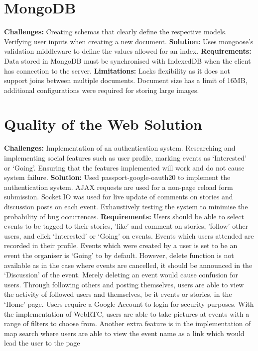 \documentclass[11pt, a4paper]{article}
\begin{document}
\section{MongoDB}
\textbf{Challenges:} Creating schemas that clearly define the respective models. Verifying user
inputs when creating a new document. \textbf{Solution:} Uses mongoose's validation middleware
\cite{validation} to define the values allowed for an index. \textbf{Requirements:} Data stored in
MongoDB must be synchronised with IndexedDB when the client has connection to the server.
\textbf{Limitations:} Lacks flexibility as it does not support joins between multiple documents.
Document size has a limit of 16MB, additional configurations were required for storing large images.

\section{Quality of the Web Solution}
\textbf{Challenges:} Implementation of an authentication system. Researching and implementing social
features such as user profile, marking events as `Interested' or `Going'. Ensuring that the features
implemented will work and do not cause system failure. \textbf{Solution:} Used
passport-google-oauth20 \cite{passport_google} to implement the authentication system. AJAX
requests are used for a non-page reload form submission. Socket.IO was used for live update of
comments on stories and discussion posts on each event. Exhaustively testing the system to
minimise the probability of bug occurrences. \textbf{Requirements:} Users should be able to select
events to be tagged to their stories, 'like' and comment on stories, 'follow' other users, and click
`Interested' or `Going' on events. Events which users attended are recorded in their profile. Events
which were created by a user is set to be an event the organiser is `Going' to by default. However,
delete function is not available as in the case where events are cancelled, it should be announced
in the `Discussion' of the event. Merely deleting an event would cause confusion for users. Through
following others and posting themselves, users are able to view the activity of followed users and
themselves, be it events or stories, in the `Home' page. Users require a Google Account to login
for security purposes. With the implementation of WebRTC, users are able to take pictures at events 
with a range of filters to choose from. Another extra feature is in the implementation of map search
where users are able to view the event name as a link which would lead the user to the page
\end{document}
